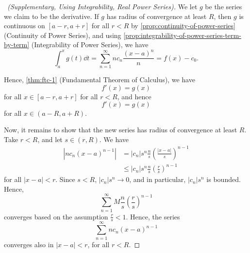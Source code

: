 \documentclass[11pt]{article}
\numberwithin{equation}{section}
\theoremstyle{definition}
\theoremstyle{remark}
\newcommand{\pqty}[1]{\left(#1\right)}
\newcommand{\abs}[1]{\left|#1\right|}
\newcommand{\ccintv}[2]{[#1,#2]}
\newcommand{\oointv}[2]{(#1,#2)}
\begin{document}
\begin{proof}[\proofname\ (Supplementary, Using Integrability, Real Power Series)]
    We let \(g\) be the series we claim to be the derivative. If \(g\) has radius of convergence at least \(R\), then \(g\) is continuous on \(\ccintv{a - r}{a + r}\) for all \(r < R\) by \autoref{prop:continuity-of-power-series} (Continuity of Power Series), and using \autoref{prop:integrability-of-power-series-term-by-term} (Integrability of Power Series), we have
    \[
        \int_{a}^{x} g\pqty{t} \dd{t} = \sum_{n = 1}^{\infty} n c_n \frac{\pqty{x - a}^{n}}{n} = f\pqty{x} - c_0.
    \]

    Hence, \autoref{thm:ftc-1} (Fundamental Theorem of Calculus), we have
    \[
        f'\pqty{x} = g\pqty{x}
    \]
    for all \(x \in \ccintv{a - r}{a + r}\) for all \(r < R\), and hence
    \[
        f'\pqty{x} = g\pqty{x}
    \]
    for all \(x \in \oointv{a - R}{a + R}\).

    Now, it remains to show that the new series has radius of convergence at least \(R\). Take \(r < R\), and let \(s \in \oointv{r}{R}\). We have
    \begin{align*}
        \abs{n c_n \pqty{x - a}^{n - 1}} &= \abs{c_n} s^n \frac{n}{s} \pqty{\frac{\abs{x - a}}{s}}^{n - 1} \\
        &\leq \abs{c_n} s^n \frac{n}{s} \pqty{\frac{r}{s}}^{n - 1}
    \end{align*}
    for all \(\abs{x - a} < r\). Since \(s < R\), \(\abs{c_n} s^n \to 0\), and in particular, \(\abs{c_n} s^n\) is bounded. Hence,
    \[
        \sum_{n = 1}^{\infty} M \frac{n}{s} \pqty{\frac{r}{s}}^{n - 1}
    \]
    converges based on the assumption \(\frac{r}{s} < 1\). Hence, the series
    \[
        \sum_{n = 1}^{\infty} n c_n \pqty{x - a}^{n - 1}
    \]
    converges also in \(\abs{x - a} < r\), for all \(r < R\).
\end{proof}
\end{document}
